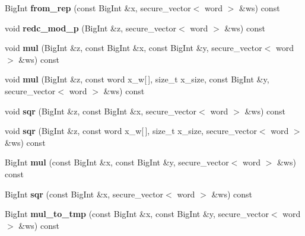 \begin{DoxyCompactItemize}
Big\+Int {\bfseries from\+\_\+rep} (const Big\+Int \&x, secure\+\_\+vector$<$ word $>$ \&ws) const
\item 
\mbox{\label{class_botan_1_1_curve_g_fp_a642c3bb3ffa9bdc0f67f43925877cc5c}} 
void {\bfseries redc\+\_\+mod\+\_\+p} (Big\+Int \&z, secure\+\_\+vector$<$ word $>$ \&ws) const
\item 
\mbox{\label{class_botan_1_1_curve_g_fp_a1d4eac437417358cec57881e6233a5b1}} 
void {\bfseries mul} (Big\+Int \&z, const Big\+Int \&x, const Big\+Int \&y, secure\+\_\+vector$<$ word $>$ \&ws) const
\item 
\mbox{\label{class_botan_1_1_curve_g_fp_a1f5864273be0c7140752ffb663599ef1}} 
void {\bfseries mul} (Big\+Int \&z, const word x\+\_\+w\mbox{[}$\,$\mbox{]}, size\+\_\+t x\+\_\+size, const Big\+Int \&y, secure\+\_\+vector$<$ word $>$ \&ws) const
\item 
\mbox{\label{class_botan_1_1_curve_g_fp_a53633c7d5a122beeb441493ae2212095}} 
void {\bfseries sqr} (Big\+Int \&z, const Big\+Int \&x, secure\+\_\+vector$<$ word $>$ \&ws) const
\item 
\mbox{\label{class_botan_1_1_curve_g_fp_a9aae7d8b28571d726bc8dace6fd60ea5}} 
void {\bfseries sqr} (Big\+Int \&z, const word x\+\_\+w\mbox{[}$\,$\mbox{]}, size\+\_\+t x\+\_\+size, secure\+\_\+vector$<$ word $>$ \&ws) const
\item 
\mbox{\label{class_botan_1_1_curve_g_fp_abb039814d0af92ff1c1ddc9c42735bb4}} 
Big\+Int {\bfseries mul} (const Big\+Int \&x, const Big\+Int \&y, secure\+\_\+vector$<$ word $>$ \&ws) const
\item 
\mbox{\label{class_botan_1_1_curve_g_fp_add9d5289bb5778a5049ddf8f3106f3ff}} 
Big\+Int {\bfseries sqr} (const Big\+Int \&x, secure\+\_\+vector$<$ word $>$ \&ws) const
\item 
\mbox{\label{class_botan_1_1_curve_g_fp_af745003fff56cc3530c44189b65f22fb}} 
Big\+Int {\bfseries mul\+\_\+to\+\_\+tmp} (const Big\+Int \&x, const Big\+Int \&y, secure\+\_\+vector$<$ word $>$ \&ws) const

\end{DoxyCompactItemize}
